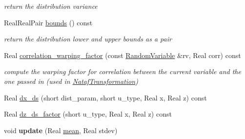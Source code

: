 \begin{DoxyCompactItemize}
\begin{DoxyCompactList}\small\item\em return the distribution variance \end{DoxyCompactList}\item 
Real\+Real\+Pair \hyperlink{classPecos_1_1NormalRandomVariable_a4bdb95a8fa5fffaa0de5102f56963cf2}{bounds} () const \label{classPecos_1_1NormalRandomVariable_a4bdb95a8fa5fffaa0de5102f56963cf2}

\begin{DoxyCompactList}\small\item\em return the distribution lower and upper bounds as a pair \end{DoxyCompactList}\item 
Real \hyperlink{classPecos_1_1NormalRandomVariable_a9ee48b3ca93459136b2e73f77873c4aa}{correlation\+\_\+warping\+\_\+factor} (const \hyperlink{classPecos_1_1RandomVariable}{Random\+Variable} \&rv, Real corr) const \label{classPecos_1_1NormalRandomVariable_a9ee48b3ca93459136b2e73f77873c4aa}

\begin{DoxyCompactList}\small\item\em compute the warping factor for correlation between the current variable and the one passed in (used in \hyperlink{classPecos_1_1NatafTransformation}{Nataf\+Transformation}) \end{DoxyCompactList}\item 
Real \hyperlink{classPecos_1_1NormalRandomVariable_af889af8adfb262c9b74f573b2a9ffc99}{dx\+\_\+ds} (short dist\+\_\+param, short u\+\_\+type, Real x, Real z) const 
\item 
Real \hyperlink{classPecos_1_1NormalRandomVariable_af6b5fc528523180bed5fc3008dcea205}{dz\+\_\+ds\+\_\+factor} (short u\+\_\+type, Real x, Real z) const 
\item 
void {\bfseries update} (Real \hyperlink{classPecos_1_1NormalRandomVariable_a962ffe5a3593be370d5c883365c060f4}{mean}, Real stdev)\label{classPecos_1_1NormalRandomVariable_a9a71c4cc1904385206f39644b461b3b3}

\end{DoxyCompactItemize}
